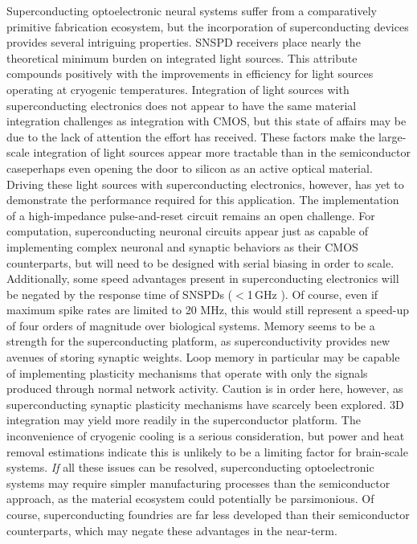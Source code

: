 \documentclass[twocolumn]{article}
\begin{document}
Superconducting optoelectronic neural systems suffer from a comparatively primitive fabrication ecosystem, but the incorporation of superconducting devices provides several intriguing properties. SNSPD receivers place nearly the theoretical minimum burden on integrated light sources. This attribute compounds positively with the improvements in efficiency for light sources operating at cryogenic temperatures. Integration of light sources with superconducting electronics does not appear to have the same material integration challenges as integration with CMOS, but this state of affairs may be due to the lack of attention the effort has received. These factors make the large-scale integration of light sources appear more tractable than in the semiconductor case\textemdash perhaps even opening the door to silicon as an active optical material. Driving these light sources with superconducting electronics, however, has yet to demonstrate the performance required for this application. The implementation of a high-impedance pulse-and-reset circuit remains an open challenge. For computation, superconducting neuronal circuits appear just as capable of implementing complex neuronal and synaptic behaviors as their CMOS counterparts, but will need to be designed with serial biasing in order to scale. Additionally, some speed advantages present in superconducting electronics will be negated by the response time of SNSPDs ($<$1\,GHz ). Of course, even if maximum spike rates are limited to 20 MHz, this would still represent a speed-up of four orders of magnitude over biological systems. Memory seems to be a strength for the superconducting platform, as superconductivity provides new avenues of storing synaptic weights. Loop memory in particular may be capable of implementing plasticity mechanisms that operate with only the signals produced through normal network activity. Caution is in order here, however, as superconducting synaptic plasticity mechanisms have scarcely been explored. 3D integration may yield more readily in the superconductor platform. The inconvenience of cryogenic cooling is a serious consideration, but power and heat removal estimations indicate this is unlikely to be a limiting factor for brain-scale systems. \textit{If} all these issues can be resolved, superconducting optoelectronic systems may require simpler manufacturing processes than the semiconductor approach, as the material ecosystem could potentially be parsimonious. Of course, superconducting foundries are far less developed than their semiconductor counterparts, which may negate these advantages in the near-term.
\end{document}
